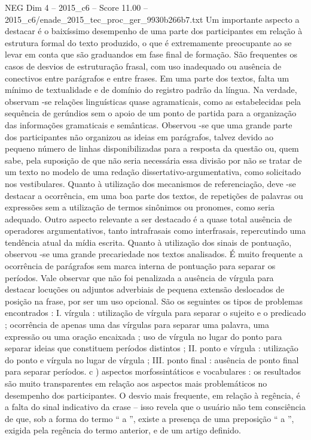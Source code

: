 \begin{textsample}{NEG Dim 4 – 2015\_c6 – Score 11.00 – 2015\_c6/enade\_2015\_tec\_proc\_ger\_9930b266b7.txt}
Um importante aspecto a destacar é o baixíssimo desempenho de uma parte dos participantes em relação à estrutura formal do texto produzido, o que é extremamente preocupante ao se levar em conta que são graduandos em fase final de formação.
São frequentes os casos de desvios de estruturação frasal, com uso inadequado ou ausência de conectivos entre parágrafos e entre frases.
Em uma parte dos textos, falta um mínimo de textualidade e de domínio do registro padrão da língua.
Na verdade, observam -se relações linguísticas quase agramaticais, como as estabelecidas pela sequência de gerúndios sem o apoio de um ponto de partida para a organização das informações gramaticais e semânticas.
Observou -se que uma grande parte dos participantes não organizou as ideias em parágrafos, talvez devido ao pequeno número de linhas disponibilizadas para a resposta da questão ou, quem sabe, pela suposição de que não seria necessária essa divisão por não se tratar de um texto no modelo de uma redação dissertativo-argumentativa, como solicitado nos vestibulares.
Quanto à utilização dos mecanismos de referenciação, deve -se destacar a ocorrência, em uma boa parte dos textos, de repetições de palavras ou expressões sem a utilização de termos sinônimos ou pronomes, como seria adequado.
Outro aspecto relevante a ser destacado é a quase total ausência de operadores argumentativos, tanto intrafrasais como interfrasais, repercutindo uma tendência atual da mídia escrita.
Quanto à utilização dos sinais de pontuação, observou -se uma grande precariedade nos textos analisados.
É muito frequente a ocorrência de parágrafos sem marca interna de pontuação para separar os períodos.
Vale observar que não foi penalizada a ausência de vírgula para destacar locuções ou adjuntos adverbiais de pequena extensão deslocados de posição na frase, por ser um uso opcional.
São os seguintes os tipos de problemas encontrados : I. vírgula : utilização de vírgula para separar o sujeito e o predicado ; ocorrência de apenas uma das vírgulas para separar uma palavra, uma expressão ou uma oração encaixada ; uso de vírgula no lugar do ponto para separar ideias que constituem períodos distintos ; II. ponto e vírgula : utilização do ponto e vírgula no lugar de vírgula ; III. ponto final : ausência de ponto final para separar períodos. c ) aspectos morfossintáticos e vocabulares : os resultados são muito transparentes em relação aos aspectos mais problemáticos no desempenho dos participantes.
O desvio mais frequente, em relação à regência, é a falta do sinal indicativo da crase – isso revela que o usuário não tem consciência de que, sob a forma do termo “ a ”, existe a presença de uma preposição “ a ”, exigida pela regência do termo anterior, e de um artigo definido.

\end{textsample}
